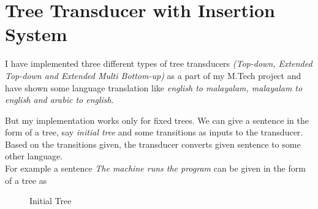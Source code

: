 \section{Tree Transducer with Insertion System}
I have implemented three different types of tree transducers \emph{(Top-down, Extended Top-down and 
Extended Multi Bottom-up)} as a part of my M.Tech project and have shown some language translation like
 \emph{english to malayalam, malayalam to english and arabic to english}.

But my implementation works only for fixed trees. We can give a sentence in the form of a tree, say \emph{initial tree} and some 
transitions as inputs to the transducer. Based on the transitions given, the transducer converts given sentence to some other
language.\\For example a sentence \emph{The machine runs the program} can be given in the form of a tree as
\begin{figure}[h]
\begin{center}
{\tiny
{}
{
	{
		{
		}
		{
		}
	}
	{
		{
		}					
		{
			{
			}
			{
			}
		}
	}
}
\label{fig2}
\caption{Initial Tree}
}
\end{center}
\end{figure}


